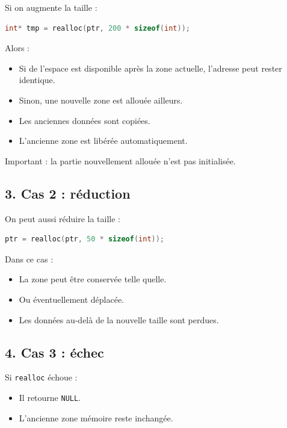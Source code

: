 Si on augmente la taille :

\begin{lstlisting}[language=C]
int* tmp = realloc(ptr, 200 * sizeof(int));
\end{lstlisting}

Alors :

\begin{itemize}
    \item Si de l’espace est disponible après la zone actuelle,
          l’adresse peut rester identique.
    \item Sinon, une nouvelle zone est allouée ailleurs.
    \item Les anciennes données sont copiées.
    \item L’ancienne zone est libérée automatiquement.
\end{itemize}

Important :
la partie nouvellement allouée n’est pas initialisée.

\subsection*{3. Cas 2 : réduction}

On peut aussi réduire la taille :

\begin{lstlisting}[language=C]
ptr = realloc(ptr, 50 * sizeof(int));
\end{lstlisting}

Dans ce cas :

\begin{itemize}
    \item La zone peut être conservée telle quelle.
    \item Ou éventuellement déplacée.
    \item Les données au-delà de la nouvelle taille sont perdues.
\end{itemize}

\subsection*{4. Cas 3 : échec}

Si \texttt{realloc} échoue :

\begin{itemize}
    \item Il retourne \texttt{NULL}.
    \item L’ancienne zone mémoire reste inchangée.
\end{itemize}

